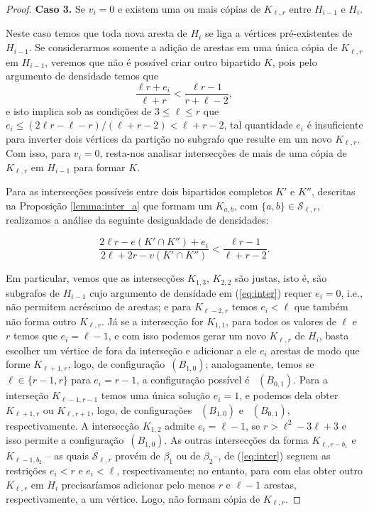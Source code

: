 \documentclass[12pt,a4paper]{book}
\newcommand{\K}{K_{\ell,r}} %
\newcommand{\Slr}{\mathcal{S}_{\ell,r}} %
\begin{document}
\begin{proof}
 \medskip \textbf{Caso 3.} 
	  Se $v_i = 0$ e existem uma ou mais cópias de $\K$ entre $H_{i-1}$ e $H_i$. 
	  
	 Neste caso temos que toda nova aresta de $H_i$ se liga a vértices pré-existentes de $H_{i-1}$. 
      Se considerarmos somente a adição de arestas em uma única cópia de $\K$ em $H_{i-1}$, veremos que não é possível criar outro bipartido $K$, pois pelo argumento de densidade temos que
    \[ 
		\frac{\ell r + e_i}{\ell+r} < \frac{\ell r-1}{r+\ell-2},
    \]
	e isto implica sob as condições de $3 \leq \ell \leq r$ que 
	$e_i \leq (2\ell r -\ell-r)/(\ell+r-2) < \ell+r-2$, 
	tal quantidade $e_i$ é insuficiente para inverter dois vértices da partição no subgrafo que resulte em um novo $\K$.
    Com isso, para $v_i=0$, resta-nos analisar intersecções de mais de uma cópia de $\K$ em $H_{i-1}$ para formar $K$.
    
    Para as intersecções possíveis entre dois bipartidos completos $K'$ e $K''$, descritas na Proposição \ref{lemma:inter_a} que formam um $K_{a,b}$, com $\{a,b\} \in \Slr$, realizamos a  análise da seguinte desigualdade de densidades:

    \begin{equation}\label{eq:inter}
        \frac{2\ell r - e(K'\cap K'') + e_i}{2\ell+2r - v(K' \cap K'')} < \frac{\ell r- 1}{\ell+r-2}.
    \end{equation}
	    
     Em particular, vemos que as intersecções $K_{1,3}$, $K_{2,2}$ são  justas, isto é, são subgrafos de $H_{i-1}$ cujo argumento de densidade em (\ref{eq:inter}) requer $e_i=0$, i.e., não permitem acréscimo de arestas;
    e para $K_{\ell-2,r}$ temos $e_i < \ell$ que também não forma outro $\K$.
     Já se a intersecção for $K_{1,1}$, para todos os valores de $\ell$ e $r$ temos que $e_i = \ell-1$, e com isso podemos gerar um novo $\K$ de $H_{i}$, basta escolher um vértice de fora da interseção e adicionar a ele $e_i$ arestas de modo que forme $K_{\ell+1,r}$, logo, de configuração~\hyperref[configB]{$(B_{1,0})$}; analogamente, temos se $\ell \in
        \{r-1, r\}$ para $e_i = r-1$, a configuração possível é
        ~\hyperref[configB]{$(B_{0,1})$}.
    Para a interseção $K_{\ell-1, r-1}$ temos uma única solução $e_i=1$, e podemos dela obter $K_{\ell+1, r}$ ou $K_{\ell,r+1}$, logo, de configurações ~\hyperref[configB]{$(B_{1,0})$}
    e ~\hyperref[configB]{$(B_{0,1})$}, respectivamente.
     A intersecção $K_{1,2}$ admite $e_i = \ell-1$, se $r > \ell^2 - 3\ell+3$ e isso permite a configuração~\hyperref[configB]{$(B_{1,0})$}.
    As outras intersecções da forma $K_{\ell, r-b_1}$ e $K_{\ell-1,b_2}$ -- as quais $\Slr$ provém de $\beta_1$ ou de $\beta_2$--,  de (\ref{eq:inter}) seguem as restrições $e_i < r$ e $e_i < \ell$, respectivamente; no entanto,
	para com elas obter outro $\K$ em $H_i$ precisaríamos adicionar pelo menos
	$r$ e $\ell-1$ arestas, respectivamente, a um vértice. Logo, não formam cópia de $\K$. 
    

\end{proof}
\end{document}
